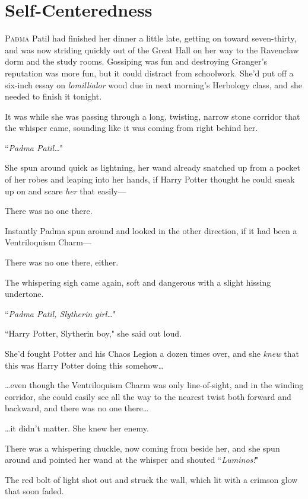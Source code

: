 \chapter{Self-Centeredness}

\lettrine{P}{adma} Patil had finished her dinner a little late, getting on toward seven-thirty, and was now striding quickly out of the Great Hall on her way to the Ravenclaw dorm and the study rooms. Gossiping was fun and destroying Granger's reputation was more fun, but it could distract from schoolwork. She'd put off a six-inch essay on \emph{lomillialor} wood due in next morning's Herbology class, and she needed to finish it tonight.

It was while she was passing through a long, twisting, narrow stone corridor that the whisper came, sounding like it was coming from right behind her.

``\emph{Padma Patil{\ldots}}"

She spun around quick as lightning, her wand already snatched up from a pocket of her robes and leaping into her hands, if Harry Potter thought he could sneak up on and scare \emph{her} that easily---

There was no one there.

Instantly Padma spun around and looked in the other direction, if it had been a Ventriloquism Charm---

There was no one there, either.

The whispering sigh came again, soft and dangerous with a slight hissing undertone.

``\emph{Padma Patil, Slytherin girl{\ldots}}"

``Harry Potter, Slytherin boy," she said out loud.

She'd fought Potter and his Chaos Legion a dozen times over, and she \emph{knew} that this was Harry Potter doing this somehow{\ldots}

{\ldots}even though the Ventriloquism Charm was only line-of-sight, and in the winding corridor, she could easily see all the way to the nearest twist both forward and backward, and there was no one there{\ldots}

{\ldots}it didn't matter. She knew her enemy.

There was a whispering chuckle, now coming from beside her, and she spun around and pointed her wand at the whisper and shouted ``\emph{Luminos!}"

The red bolt of light shot out and struck the wall, which lit with a crimson glow that soon faded.

